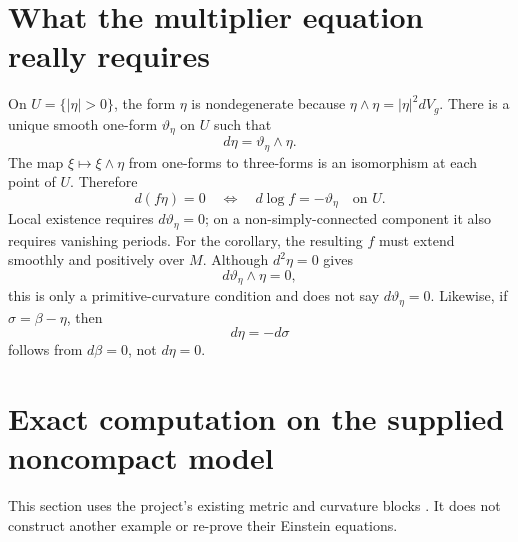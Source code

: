 \documentclass[11pt]{article}
\theoremstyle{remark}
\begin{document}
\section{What the multiplier equation really requires}
On \(U=\{|\eta|>0\}\), the form \(\eta\) is nondegenerate because
\(\eta\wedge\eta=|\eta|^2dV_g\).
There is a unique smooth one-form \(\vartheta_\eta\) on \(U\) such that
\[
 d\eta=\vartheta_\eta\wedge\eta.
 \tag{8}
\]
The map \(\xi\mapsto\xi\wedge\eta\) from one-forms to three-forms
is an isomorphism at each point of \(U\).
Therefore
\[
 d(f\eta)=0\quad\Longleftrightarrow\quad
 d\log f=-\vartheta_\eta\quad\text{on }U.
 \tag{9}
\]
Local existence requires \(d\vartheta_\eta=0\); on a non-simply-connected
component it also requires vanishing periods. For the corollary,
the resulting \(f\) must extend smoothly and positively over \(M\).
Although \(d^2\eta=0\) gives
\[
 d\vartheta_\eta\wedge\eta=0,
\]
this is only a primitive-curvature condition and does not say
\(d\vartheta_\eta=0\).
Likewise, if \(\sigma=\beta-\eta\), then
\[
 d\eta=-d\sigma
\]
follows from \(d\beta=0\), not \(d\eta=0\).

\section{Exact computation on the supplied noncompact model}
This section uses the project's existing metric and curvature blocks
\cite{Project,ProjectCurv}. It does not construct another example or
re-prove their Einstein equations.
\end{document}
